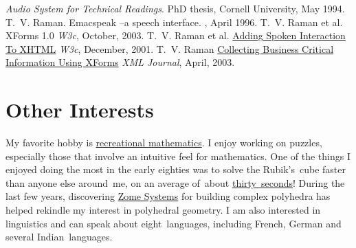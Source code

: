 \documentclass{article}
\begin{document}
\begin{plainbibliography}{}
{{\em Audio System for Technical Readings}.}  
\newblock PhD
thesis, Cornell University, May 1994.
 T.~V.  Raman.  
\newblock Emacspeak --a
  speech interface.  
, April 1996.
 T.~V.  Raman et al.  
\newblock XForms 1.0 
\newblock \emph{W3c}, October, 2003.  
\newblock
 T.~V.  Raman et al.  
\newblock
  \href{http://www.w3.org/tr/xml-events}{Adding Spoken Interaction To XHTML} 
\newblock \emph{W3c}, December, 2001.  
 T.~V.  Raman 
\newblock \href{http://www.sys-con.com/xml/article.cfm?id=578}%
{Collecting Business Critical Information Using XForms} 
\newblock
  \emph{XML Journal}, April, 2003.
\end{plainbibliography}

\begin{center}
  \end{center}




\section*{Other Interests}
My favorite hobby is
\href{http://www.cs.cornell.edu/home/raman/publications/polyhedra}%
{recreational mathematics}.  I enjoy working on puzzles,
especially those that involve an intuitive feel for mathematics.
One of the things I enjoyed doing the most in the early eighties
was to solve the Rubik's~cube faster than anyone else around~me,
on an average of~about 
\href{http://video.google.com/videoplay?docid=-4180435763269825467}{thirty~seconds}!  During the last few
years, discovering
\href{http://emacspeak.sf.net/raman/publications/polyhedra/}{Zome
  Systems} for building complex polyhedra has helped rekindle my
interest in polyhedral geometry.  I am also interested in
linguistics and can speak about eight~languages, including
French, German and several Indian~languages.
\end{document}
